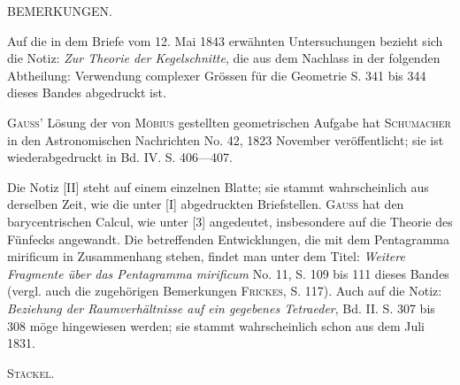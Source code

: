 \begingroup\small
\begin{center}
BEMERKUNGEN.
\end{center}

Auf die in dem Briefe vom 12. Mai 1843 erwähnten Untersuchungen bezieht sich die Notiz: \emph{Zur Theorie der Kegelschnitte}, die aus dem Nachlass in der folgenden Abtheilung: Verwendung complexer Grössen für die Geometrie S. 341 bis 344 dieses Bandes abgedruckt ist.

\textsc{Gauss}' Lösung der von \textsc{Möbius} gestellten geometrischen Aufgabe hat \textsc{Schumacher} in den Astronomischen Nachrichten No. 42, 1823 November veröffentlicht; sie ist wiederabgedruckt in Bd. IV. S. 406---407.

Die Notiz [II] steht auf einem einzelnen Blatte; sie stammt wahrscheinlich aus derselben Zeit, wie die unter [I] abgedruckten Briefstellen. \textsc{Gauss} hat den barycentrischen Calcul, wie unter [3] angedeutet, insbesondere auf die Theorie des Fünfecks angewandt. Die betreffenden Entwicklungen, die mit dem Pentagramma mirificum in Zusammenhang stehen, findet man unter dem Titel: \emph{Weitere Fragmente über das Pentagramma mirificum} No. 11, S. 109 bis 111 dieses Bandes (vergl. auch die zugehörigen Bemerkungen \textsc{Frickes}, S. 117). Auch auf die Notiz: \emph{Beziehung der Raumverhältnisse auf ein gegebenes Tetraeder}, Bd. II. S. 307 bis 308 möge hingewiesen werden; sie stammt wahrscheinlich schon aus dem Juli 1831.

\begin{flushright}
\textsc{Stäckel}.
\end{flushright}
\par\endgroup
